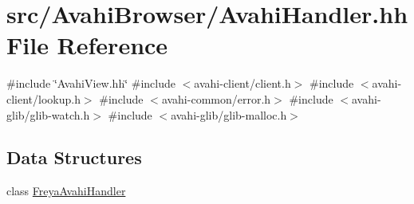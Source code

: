 \hypertarget{AvahiHandler_8hh}{
\section{src/\-Avahi\-Browser/\-Avahi\-Handler.hh \-File \-Reference}
\label{AvahiHandler_8hh}
}
{\ttfamily \#include \char`\"{}\-Avahi\-View.\-hh\char`\"{}}\*
{\ttfamily \#include $<$avahi-\/client/client.\-h$>$}\*
{\ttfamily \#include $<$avahi-\/client/lookup.\-h$>$}\*
{\ttfamily \#include $<$avahi-\/common/error.\-h$>$}\*
{\ttfamily \#include $<$avahi-\/glib/glib-\/watch.\-h$>$}\*
{\ttfamily \#include $<$avahi-\/glib/glib-\/malloc.\-h$>$}\*
\subsection*{\-Data \-Structures}
\begin{DoxyCompactItemize}
\item 
class \hyperlink{classFreyaAvahiHandler}{\-Freya\-Avahi\-Handler}
\end{DoxyCompactItemize}
